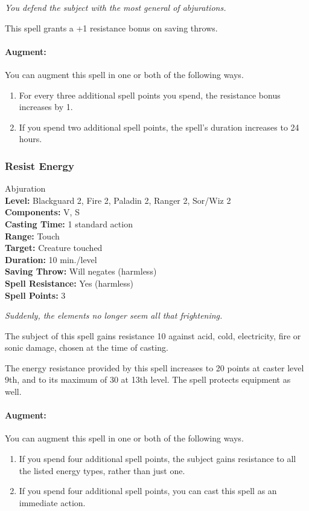 \emph{You defend the subject with the most general of abjurations.}

This spell grants a +1 resistance bonus on saving throws.

\paragraph{Augment:} You can augment this spell in one or both of the following ways.
\begin{enumerate}
\item For every three additional spell points you spend, the resistance bonus increases by 1.
\item If you spend two additional spell points, the spell's duration increases to 24 hours.
\end{enumerate}

\subsubsection{Resist Energy}
\label{Spell:ResistEnergy}
Abjuration
\\ \textbf{Level:} Blackguard 2, Fire 2, Paladin 2, Ranger 2, Sor/Wiz 2
\\ \textbf{Components:} V, S
\\ \textbf{Casting Time:} 1 standard action
\\ \textbf{Range:} Touch
\\ \textbf{Target:} Creature touched
\\ \textbf{Duration:} 10 min./level
\\ \textbf{Saving Throw:} Will negates (harmless)
\\ \textbf{Spell Resistance:} Yes (harmless)
\\ \textbf{Spell Points:} 3

\emph{Suddenly, the elements no longer seem all that frightening.}

The subject of this spell gains resistance 10 against acid, cold, electricity, fire or sonic damage, chosen at the time of casting.

The energy resistance provided by this spell increases to 20 points at caster level 9th, and to its maximum of 30 at 13th level.
The spell protects equipment as well.

\paragraph{Augment:} You can augment this spell in one or both of the following ways.
\begin{enumerate}
\item If you spend four additional spell points, the subject gains resistance to all the listed energy types, rather than just one.
\item If you spend four additional spell points, you can cast this spell as an immediate action.
\end{enumerate}
